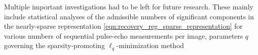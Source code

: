Multiple important investigations had to be left for
future research.
These mainly include
statistical analyses of
the admissible numbers of
significant components in
the nearly-sparse representation
\eqref{eqn:recovery_reg_sparse_representation} for various
numbers of
sequential pulse-echo measurements per image,
parameters $q$ governing
the sparsity-promoting $\ell_{q}$-minimization method
